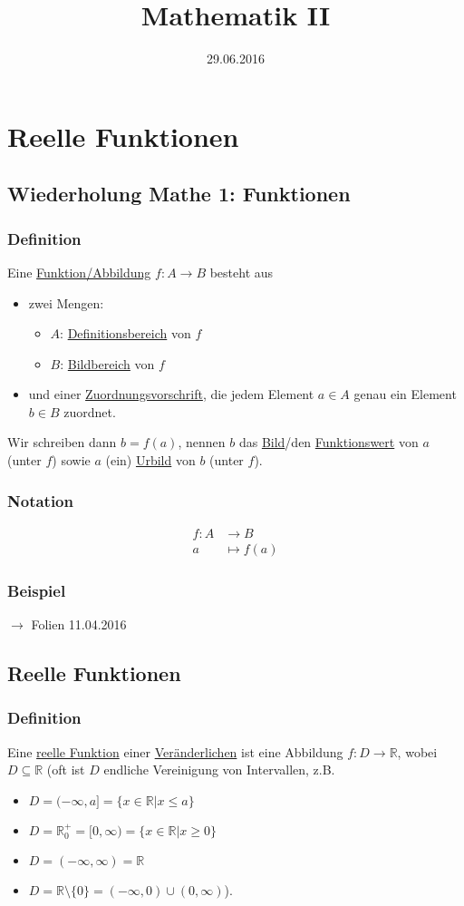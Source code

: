 \documentclass[12pt, titlepage]{article}
\title{Mathematik II}
\date{29.06.2016}
\newcommand{\R}{\mathds{R}}
\renewcommand{\>}{\rightarrow}
\renewcommand{\*}{\cdot}
\begin{document}
	\maketitle
	\tableofcontents
	\newpage
	\section{Reelle Funktionen}
	\subsection{Wiederholung Mathe 1: Funktionen}
	\subsubsection*{Definition}
		Eine \underline{Funktion/Abbildung} $f\colon A\> B$ besteht aus
		\begin{itemize}
			\item zwei Mengen:
			\begin{itemize}
				\item $A$: \underline{Definitionsbereich} von $f$
				\item $B$: \underline{Bildbereich} von $f$
			\end{itemize}
			\item und einer \underline{Zuordnungsvorschrift}, die jedem Element $a\in A$ genau ein Element $b\in B$ zuordnet.
		\end{itemize}
		Wir schreiben dann $b=f(a)$, nennen $b$ das \underline{Bild}/den \underline{Funktionswert} von $a$ (unter $f$) sowie $a$ (ein) \underline{Urbild} von $b$ (unter $f$).
	\subsubsection*{Notation}
		\vspace{-1cm}\begin{align*}
			f\colon A&\> B\\
			a&\mapsto f(a)
		\end{align*}
	\subsubsection*{Beispiel}
		$\>$ Folien 11.04.2016
	\subsection{Reelle Funktionen}
	\subsubsection*{Definition}
	Eine \underline{reelle Funktion} einer \underline{Veränderlichen} ist eine Abbildung $f\colon D\> \R$, wobei $D\subseteq \R$ (oft ist $D$ endliche Vereinigung von Intervallen, z.B.
	\begin{itemize}
		\item $ D=(-\infty,a]=\{x\in \R|x\leq a\} $
		\item $ D=\R^+_0=[0,\infty)=\{x\in\R|x\geq 0\}$
		\item $ D=(-\infty,\infty)=\R $
		\item $ D=\R\setminus\{0\}=(-\infty,0)\cup(0,\infty) $\hfill).
	\end{itemize}
\end{document}
